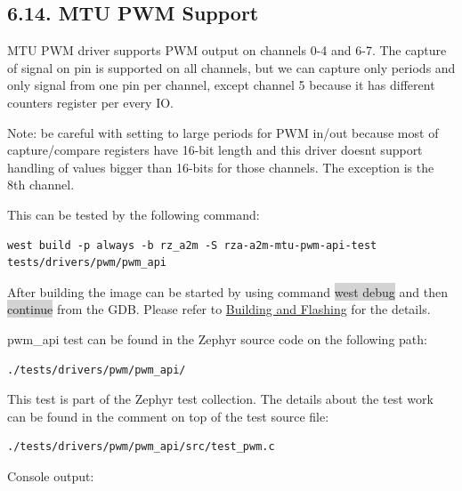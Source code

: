 \documentclass[11pt,a4paper,oneside]{article}
\begin{document}
\subsection*{6.14. MTU PWM Support}\label{mtu-pwm-support}

MTU PWM driver supports PWM output on channels 0-4 and 6-7. The capture
of signal on pin is supported on all channels, but we can capture only
periods and only signal from one pin per channel, except channel 5
because it has different counters register per every IO.

Note: be careful with setting to large periods for PWM in/out because
most of capture/compare registers have 16-bit length and this driver
doesn\textquotesingle t support handling of values bigger than 16-bits
for those channels. The exception is the 8th channel.

This can be tested by the following command:

\begin{lstlisting}
west build -p always -b rz_a2m -S rza-a2m-mtu-pwm-api-test
tests/drivers/pwm/pwm_api
\end{lstlisting}

After building the image can be started by using command \colorbox{lightgray}{west debug}
and then \colorbox{lightgray}{continue} from the GDB. Please refer to
\hyperref[building-and-flashing]{Building and Flashing} for the
details.

pwm\_api test can be found in the Zephyr source code on the following
path:

\begin{lstlisting}
./tests/drivers/pwm/pwm_api/
\end{lstlisting}

This test is part of the Zephyr test collection. The details about the
test work can be found in the comment on top of the test source file:
\begin{lstlisting}
./tests/drivers/pwm/pwm_api/src/test_pwm.c
\end{lstlisting}

Console output:
\end{document}

